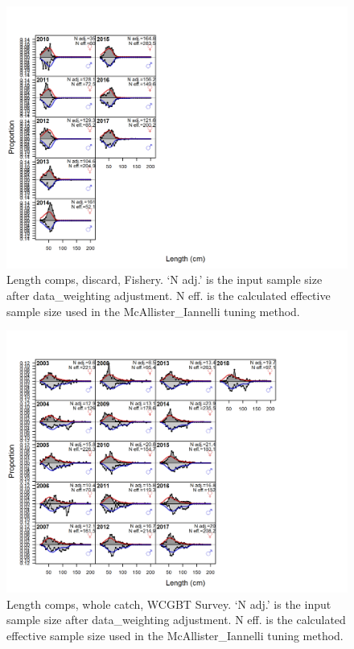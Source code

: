 \documentclass[12pt,]{article}
\begin{document}
\begin{figure}
\centering
\includegraphics{./r4ss/plots_mod1/comp_lenfit_flt1mkt1.png}
\caption{Length comps, discard, Fishery. `N adj.' is the input sample
size after data\_weighting adjustment. N eff. is the calculated
effective sample size used in the McAllister\_Iannelli tuning method.
\label{fig:mod1_2_comp_lenfit_flt1mkt1}}
\end{figure}

\begin{figure}
\centering
\includegraphics{./r4ss/plots_mod1/comp_lenfit_flt5mkt0.png}
\caption{Length comps, whole catch, WCGBT Survey. `N adj.' is the input
sample size after data\_weighting adjustment. N eff. is the calculated
effective sample size used in the McAllister\_Iannelli tuning method.
\label{fig:mod1_3_comp_lenfit_flt5mkt0}}
\end{figure}
\end{document}
